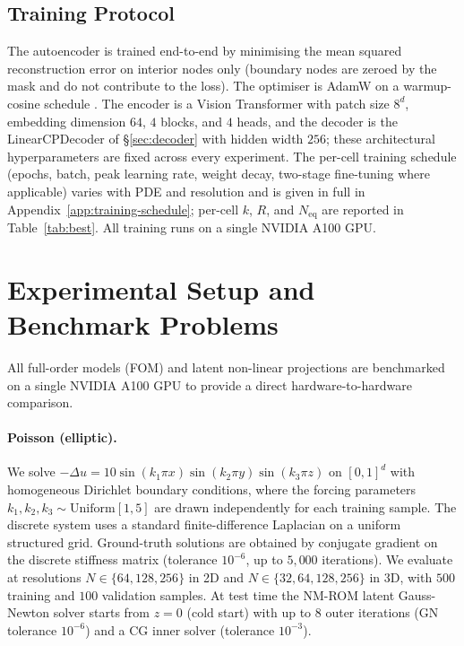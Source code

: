 \documentclass{article}
\begin{document}
\subsection{Training Protocol}

The autoencoder is trained end-to-end by minimising the mean squared
reconstruction error on interior nodes only (boundary nodes are zeroed
by the mask and do not contribute to the loss). The optimiser is AdamW
\citep{LoshchilovHutter2019AdamW} on a warmup-cosine schedule
\citep{LoshchilovHutter2017SGDR}. The
encoder is a Vision Transformer with patch size $8^d$, embedding
dimension $64$, $4$ blocks, and $4$ heads, and the decoder is the
LinearCPDecoder of \S\ref{sec:decoder} with hidden width $256$; these
architectural hyperparameters are fixed across every experiment. The
per-cell training schedule (epochs, batch, peak learning rate, weight
decay, two-stage fine-tuning where applicable) varies with PDE and
resolution and is given in full in
Appendix~\ref{app:training-schedule}; per-cell $k$, $R$, and
$N_\mathrm{eq}$ are reported in Table~\ref{tab:best}. All training
runs on a single NVIDIA A100 GPU.

\section{Experimental Setup and Benchmark Problems}
\label{sec:setup}

All full-order models (FOM) and latent non-linear projections are
benchmarked on a single NVIDIA A100 GPU to provide a direct
hardware-to-hardware comparison.

\paragraph{Poisson (elliptic).}
We solve $-\Delta u = 10\sin(k_1 \pi x)\sin(k_2 \pi y)\sin(k_3 \pi z)$
on $[0,1]^d$ with homogeneous Dirichlet boundary conditions, where the
forcing parameters $k_1, k_2, k_3 \sim \mathrm{Uniform}[1, 5]$ are
drawn independently for each training sample. The discrete system uses
a standard finite-difference Laplacian on a uniform structured grid.
Ground-truth solutions are obtained by conjugate gradient on the
discrete stiffness matrix (tolerance $10^{-6}$, up to $5{,}000$
iterations). We evaluate at resolutions $N \in \{64, 128, 256\}$ in
2D and $N \in \{32, 64, 128, 256\}$ in 3D, with $500$ training and
$100$ validation samples. At test time the NM-ROM latent Gauss-Newton
solver starts from $z = 0$ (cold start) with up to $8$ outer iterations
(GN tolerance $10^{-6}$) and a CG inner solver (tolerance $10^{-3}$).
\end{document}
